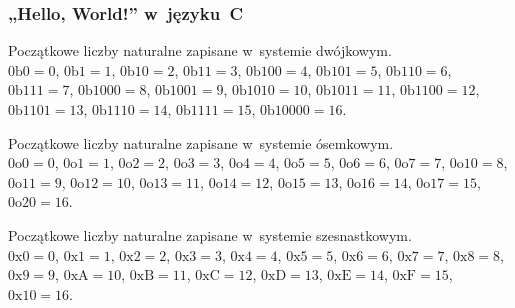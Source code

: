 \documentclass[10pt,t]{beamer}
\begin{document}
\begin{frame}
  \frametitle{„Hello, World!” w~języku~C}

  Początkowe liczby naturalne zapisane w~systemie dwójkowym. \\
  $0\text{b}0 = 0$, $0\text{b}1 = 1$, $0\text{b}10 = 2$, $0\text{b}11 = 3$,
  $0\text{b}100 = 4$, $0\text{b}101 = 5$, $0\text{b}110 = 6$,
  $0\text{b}111 = 7$, $0\text{b}1000 = 8$, $0\text{b}1001 = 9$,
  $0\text{b}1010 = 10$, $0\text{b}1011 = 11$, $0\text{b}1100 = 12$,
  $0\text{b}1101 = 13$, $0\text{b}1110 = 14$, $0\text{b}1111 = 15$,
  $0\text{b}10000 = 16$.

  Początkowe liczby naturalne zapisane w~systemie ósemkowym. \\
  $0\text{o}0 = 0$, $0\text{o}1 = 1$, $0\text{o}2 = 2$, $0\text{o}3 = 3$,
  $0\text{o}4 = 4$, $0\text{o}5 = 5$, $0\text{o}6 = 6$, $0\text{o}7 = 7$,
  $0\text{o}10 = 8$, $0\text{o}11 = 9$, $0\text{o}12 = 10$,
  $0\text{o}13 = 11$, $0\text{o}14 = 12$, $0\text{o}15 = 13$,
  $0\text{o}16 = 14$, $0\text{o}17 = 15$, $0\text{o}20 = 16$.

  Początkowe liczby naturalne zapisane w~systemie szesnastkowym. \\
  $0\text{x}0 = 0$, $0\text{x}1 = 1$, $0\text{x}2 = 2$, $0\text{x}3 = 3$,
  $0\text{x}4 = 4$, $0\text{x}5 = 5$, $0\text{x}6 = 6$, $0\text{x}7 = 7$,
  $0\text{x}8 = 8$, $0\text{x}9 = 9$, $0\text{xA} = 10$,
  $0\text{xB} = 11$, $0\text{xC} = 12$, $0\text{xD} = 13$,
  $0\text{xE} = 14$, $0\text{xF} = 15$, $0\text{x}10 = 16$.

\end{frame}


















\end{document}
